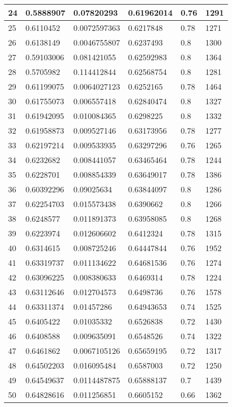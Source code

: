 \begin{longtable}{|l|l|l|l|l|l|}
24 & 0.5888907 & 0.07820293 & 0.61962014 & 0.76 & 1291 \\ \hline 
25 & 0.6110452 & 0.0072597363 & 0.6217848 & 0.78 & 1271 \\ \hline 
26 & 0.6138149 & 0.0046755807 & 0.6237493 & 0.8 & 1300 \\ \hline 
27 & 0.59103006 & 0.081421055 & 0.62592983 & 0.8 & 1364 \\ \hline 
28 & 0.5705982 & 0.114412844 & 0.62568754 & 0.8 & 1281 \\ \hline 
29 & 0.61199075 & 0.0064027123 & 0.6252165 & 0.78 & 1464 \\ \hline 
30 & 0.61755073 & 0.006557418 & 0.62840474 & 0.8 & 1327 \\ \hline 
31 & 0.61942095 & 0.010084365 & 0.6298225 & 0.8 & 1332 \\ \hline 
32 & 0.61958873 & 0.009527146 & 0.63173956 & 0.78 & 1277 \\ \hline 
33 & 0.62197214 & 0.009533935 & 0.63297296 & 0.76 & 1265 \\ \hline 
34 & 0.6232682 & 0.008441057 & 0.63465464 & 0.78 & 1244 \\ \hline 
35 & 0.6228701 & 0.008854339 & 0.63649017 & 0.78 & 1386 \\ \hline 
36 & 0.60392296 & 0.09025634 & 0.63844097 & 0.8 & 1286 \\ \hline 
37 & 0.62254703 & 0.015573438 & 0.6390662 & 0.8 & 1266 \\ \hline 
38 & 0.6248577 & 0.011891373 & 0.63958085 & 0.8 & 1268 \\ \hline 
39 & 0.6223974 & 0.012606602 & 0.6412324 & 0.78 & 1315 \\ \hline 
40 & 0.6314615 & 0.008725246 & 0.64447844 & 0.76 & 1952 \\ \hline 
41 & 0.63319737 & 0.011134622 & 0.64681536 & 0.76 & 1274 \\ \hline 
42 & 0.63096225 & 0.008380633 & 0.6469314 & 0.78 & 1224 \\ \hline 
43 & 0.63112646 & 0.012704573 & 0.6498736 & 0.76 & 1578 \\ \hline 
44 & 0.63311374 & 0.01457286 & 0.64943653 & 0.74 & 1525 \\ \hline 
45 & 0.6405422 & 0.01035332 & 0.6526838 & 0.72 & 1430 \\ \hline 
46 & 0.6408588 & 0.009635091 & 0.6548526 & 0.74 & 1322 \\ \hline 
47 & 0.6461862 & 0.0067105126 & 0.65659195 & 0.72 & 1317 \\ \hline 
48 & 0.64502203 & 0.016095484 & 0.6587003 & 0.72 & 1250 \\ \hline 
49 & 0.64549637 & 0.0114487875 & 0.65888137 & 0.7 & 1439 \\ \hline 
50 & 0.64828616 & 0.011256851 & 0.6605152 & 0.66 & 1362 \\ \hline 
\end{longtable}